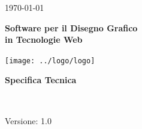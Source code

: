 \usepackage{multirow}
\title{\TITOLODOC}
\author{Dal Bosco Davide}



\renewcommand{\insertversion}{1.0} %
\renewcommand{\TITOLODOC}{Specifica Tecnica} %
\renewcommand{\glosspath}{.\glossario} %

\begin{titlepage}
\begin{center}
	\begin{Large}	\today \end{Large}
\end{center}

\vspace{20pt}

\begin{center}
	\begin{Huge}
				\textbf{\ajax}
	\end{Huge}
\end{center}			

\begin{center}
	\begin{large}
				\textbf{Software per il Disegno Grafico\\ in Tecnologie Web}
	\end{large}
\end{center}			

\vspace{20pt}

\begin{center}
\texttt{[image: ../logo/logo]}
\end{center}

\vspace{170pt}
\begin{center} %
	\begin{Huge}
				\textbf{\TITOLODOC}
	\end{Huge}
			\\
\end{center}
\vspace{190pt}
\begin{center}
Versione: \insertversion
\end{center}
\end{titlepage}

\newpage

